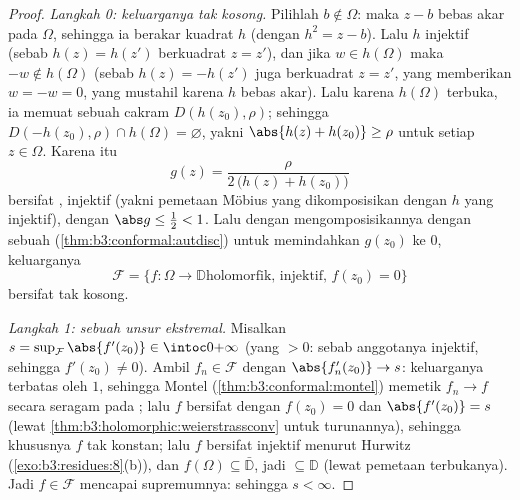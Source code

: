 \begin{proof}
\emph{Langkah 0: keluarganya tak kosong.} Pilihlah $b \notin \Omega$:
maka $z - b$ bebas akar pada $\Omega$, sehingga ia berakar kuadrat
 $h$ (dengan $h^2 = z - b$). Lalu $h$ injektif (sebab $h(z) =
h(z')$ berkuadrat $z = z'$), dan jika $w \in h(\Omega)$ maka $-w
\notin h(\Omega)$ (sebab $h(z) = -h(z')$ juga berkuadrat $z = z'$,
yang memberikan $w = -w = 0$, yang mustahil karena $h$ bebas akar). Lalu karena
$h(\Omega)$ terbuka, ia memuat sebuah cakram $D(h(z_0), \rho)$;
sehingga $D(-h(z_0), \rho) \cap h(\Omega) = \varnothing$, yakni
$\abs{h(z) + h(z_0)} \geq \rho$ untuk setiap $z \in \Omega$.
Karena itu
\[
g(z) = \frac{\rho}{2\,\bigl(h(z) + h(z_0)\bigr)}
\]
bersifat , injektif (yakni pemetaan Möbius yang dikomposisikan dengan
$h$ yang injektif), dengan $\abs g \leq \frac12 < 1$. Lalu dengan mengomposisikannya dengan sebuah 
(\cref{thm:b3:conformal:autdisc}) untuk memindahkan $g(z_0)$ ke $0$,
keluarganya
\[
\mathcal F = \{f \colon \Omega \to \mathbb D \text{
holomorfik, injektif, } f(z_0) = 0\}
\]
bersifat tak kosong.

\emph{Langkah 1: sebuah unsur ekstremal.} Misalkan $s =
\sup_{\mathcal F}\abs{f'(z_0)} \in \intoc0{+\infty}$ (yang $> 0$: sebab
anggotanya injektif, sehingga $f'(z_0) \neq 0$). Ambil $f_n \in
\mathcal F$ dengan $\abs{f_n'(z_0)} \to s$: keluarganya
terbatas oleh $1$, sehingga Montel (\cref{thm:b3:conformal:montel})
memetik $f_n \to f$ secara seragam pada ; lalu $f$ bersifat
 dengan $f(z_0) = 0$ dan $\abs{f'(z_0)} = s$
(lewat \cref{thm:b3:holomorphic:weierstrassconv} untuk
turunannya), sehingga khususnya $f$ tak konstan; lalu $f$ bersifat
injektif menurut Hurwitz (\cref{exo:b3:residues:8}(b)), dan
$f(\Omega) \subseteq \bar{\mathbb D}$, jadi $\subseteq
\mathbb D$ (lewat pemetaan terbukanya). Jadi $f \in \mathcal F$ mencapai
supremumnya: sehingga $s < \infty$.


\end{proof}
